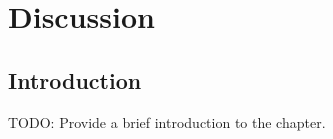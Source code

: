 \chapter{Discussion}
\label{sec:discussion}

\section{Introduction}
TODO: Provide a brief introduction to the chapter.
